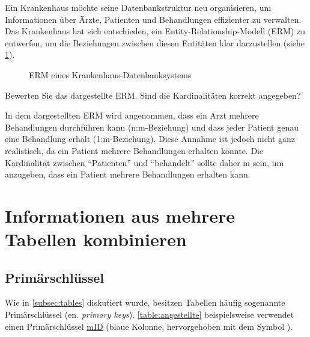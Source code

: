 \begin{myexercise}
  Ein Krankenhaus möchte seine Datenbankstruktur neu organisieren, um Informationen über Ärzte, Patienten und Behandlungen effizienter zu verwalten. Das Krankenhaus hat sich entschieden, ein Entity-Relationship-Modell (ERM) zu entwerfen, um die Beziehungen zwischen diesen Entitäten klar darzustellen (siehe \cref{fig:erm-hospital}).
  \begin{figure}[H]
    \centering
    \caption{ERM eines Krankenhaus-Datenbanksystems}
    \label{fig:erm-hospital}
  \end{figure}
  Bewerten Sie das dargestellte ERM. Sind die Kardinalitäten korrekt angegeben?
  \begin{myanswer}
    In dem dargestellten ERM wird angenommen, dass ein Arzt mehrere Behandlungen durchführen kann (n:m-Beziehung) und dass jeder Patient genau eine Behandlung erhält (1:m-Beziehung). Diese Annahme ist jedoch nicht ganz realistisch, da ein Patient mehrere Behandlungen erhalten könnte. Die Kardinalität zwischen \enquote{Patienten} und \enquote{behandelt} sollte daher m sein, um anzugeben, dass ein Patient mehrere Behandlungen erhalten kann.
  \end{myanswer}
\end{myexercise}


\clearpage


\section{Informationen aus mehrere Tabellen kombinieren}
\subsection{Primärschlüssel}
Wie in \cref{subsec:tables} diskutiert wurde, besitzen Tabellen häufig sogenannte Primärschlüssel (en. \textit{primary keys}). \cref{table:angestellte} beispielsweise verwendet einen Primärschlüssel \underline{mID} (blaue Kolonne, hervorgehoben mit dem Symbol ).

